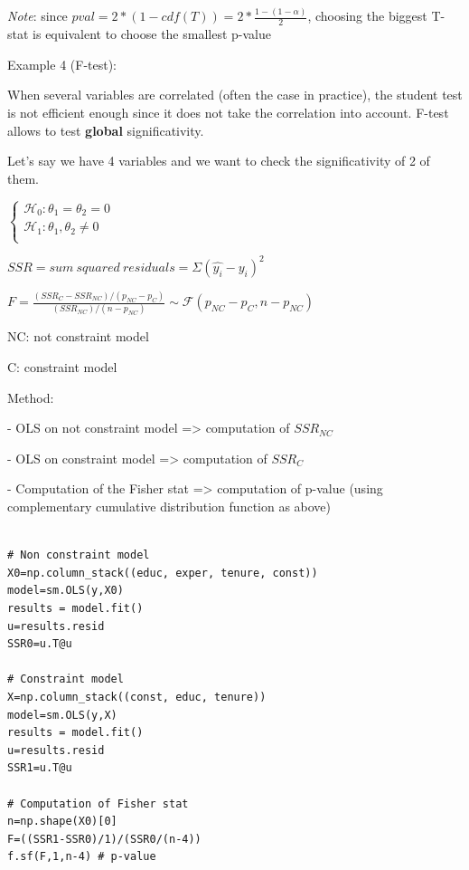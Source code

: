 \textit{Note}: since $pval = 2*(1-cdf(T)) = 2*\frac{1-(1-\alpha)}{2}$, choosing the biggest T-stat is equivalent to choose the smallest p-value

\vspace{5mm}

Example 4 (F-test):

\vspace{5mm}

When several variables are correlated (often the case in practice), the student test is not efficient enough since it does not take the correlation into account. F-test allows to test \textbf{global} significativity.

Let's say we have 4 variables and we want to check the significativity of 2 of them.

\vspace{5mm}

$
\left\{
    \begin{array}{ll}
        \mathcal{H}_0: \theta_1 = \theta_2 = 0\\
        \mathcal{H}_1: \theta_1, \theta_2 \neq 0 \\
    \end{array}
\right.
$

\vspace{5mm}

$SSR = sum~squared~residuals = \Sigma (\widehat{y_i} - y_i)^2$

\vspace{5mm}

$F = \frac{(SSR_C - SSR_{NC})/(p_{NC} - p_C)}{(SSR_{NC})/(n-p_{NC})} \sim \mathcal{F}(p_{NC} - p_C, n-p_{NC})$

\vspace{5mm}

NC: not constraint model

C: constraint model

\vspace{5mm}

Method:

- OLS on not constraint model => computation of $SSR_{NC}$

- OLS  on constraint model => computation of $SSR_{C}$

- Computation of the Fisher stat => computation of p-value (using complementary cumulative distribution function as above)

\lstset{language=Python}
\lstset{frame=lines}
\lstset{basicstyle=\footnotesize}
\begin{lstlisting}

# Non constraint model
X0=np.column_stack((educ, exper, tenure, const))
model=sm.OLS(y,X0)
results = model.fit()
u=results.resid
SSR0=u.T@u

# Constraint model
X=np.column_stack((const, educ, tenure))
model=sm.OLS(y,X)
results = model.fit()
u=results.resid
SSR1=u.T@u

# Computation of Fisher stat
n=np.shape(X0)[0]
F=((SSR1-SSR0)/1)/(SSR0/(n-4))
f.sf(F,1,n-4) # p-value

\end{lstlisting}


\vspace{5mm}